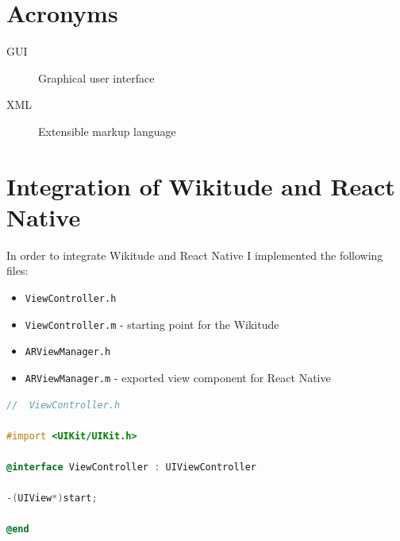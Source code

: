 \documentclass[thesis=M,english]{FITthesis}[2012/10/20]
\begin{document}



\appendix

\chapter{Acronyms}
\begin{description}
	\item[GUI] Graphical user interface
	\item[XML] Extensible markup language
\end{description}

\chapter{Integration of Wikitude and React Native}
\label{apendix:integration}
In order to integrate Wikitude and React Native I implemented the following files:
\begin{itemize}
\item \verb|ViewController.h| 
\item \verb|ViewController.m| - starting point for the Wikitude
\item \verb|ARViewManager.h|
\item \verb|ARViewManager.m| - exported view component for React Native
\end{itemize}

\begin{lstlisting}[language=C]
//  ViewController.h

#import <UIKit/UIKit.h>

@interface ViewController : UIViewController

-(UIView*)start;

@end

\end{lstlisting}
\end{document}
